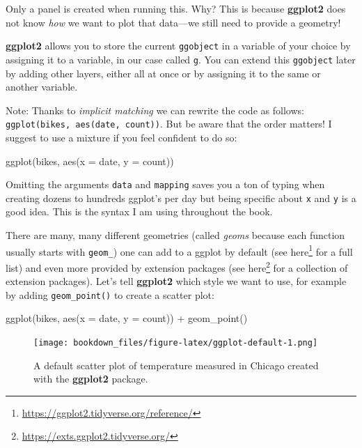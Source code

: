 \documentclass[
]{krantz}
\makeatletter
\newenvironment{Shaded}{\begin{snugshade}}{\end{snugshade}}
\newcommand{\AttributeTok}[1]{\textcolor[rgb]{0.61,0.61,0.61}{#1}}
\newcommand{\FunctionTok}[1]{\textcolor[rgb]{0,0,0}{#1}}
\newcommand{\NormalTok}[1]{#1}
\newcommand{\SpecialCharTok}[1]{\textcolor[rgb]{0,0,0}{#1}}
\renewcommand{\href}[2]{#2\footnote{\url{#1}}}
\newenvironment{kframe}{%
\medskip{}
\setlength{\fboxsep}{.8em}
 \def\at@end@of@kframe{}%
 \ifinner\ifhmode%
  \def\at@end@of@kframe{\end{minipage}}%
  \begin{minipage}{\columnwidth}%
 \fi\fi%
 \def\FrameCommand##1{\hskip\@totalleftmargin \hskip-\fboxsep
 \colorbox{shadecolor}{##1}\hskip-\fboxsep
     \hskip-\linewidth \hskip-\@totalleftmargin \hskip\columnwidth}%
 \MakeFramed {\advance\hsize-\width
   \@totalleftmargin\z@ \linewidth\hsize
   \@setminipage}}%
 {\par\unskip\endMakeFramed%
 \at@end@of@kframe}
\renewenvironment{Shaded}{\begin{kframe}}{\end{kframe}}
\makeatother
\begin{document}
Only a panel is created when running this. Why? This is because \textbf{ggplot2} does not know \emph{how} we want to plot that data---we still need to provide a geometry!

\textbf{ggplot2} allows you to store the current \texttt{ggobject} in a variable of your choice by assigning it to a variable, in our case called \texttt{g}. You can extend this \texttt{ggobject} later by adding other layers, either all at once or by assigning it to the same or another variable.

Note: Thanks to \emph{implicit matching} we can rewrite the code as follows: \texttt{ggplot(bikes,\ aes(date,\ count))}. But be aware that the order matters! I suggest to use a mixture if you feel confident to do so:

\begin{Shaded}
\begin{Highlighting}[]
\FunctionTok{ggplot}\NormalTok{(bikes, }\FunctionTok{aes}\NormalTok{(}\AttributeTok{x =}\NormalTok{ date, }\AttributeTok{y =}\NormalTok{ count))}
\end{Highlighting}
\end{Shaded}

Omitting the arguments \texttt{data} and \texttt{mapping} saves you a ton of typing when creating dozens to hundreds ggplot's per day but being specific about \texttt{x} and \texttt{y} is a good idea. This is the syntax I am using throughout the book.

There are many, many different geometries (called \emph{geoms} because each function usually starts with \texttt{geom\_}) one can add to a ggplot by default (see \href{https://ggplot2.tidyverse.org/reference/}{here} for a full list) and even more provided by extension packages (see \href{https://exts.ggplot2.tidyverse.org/}{here} for a collection of extension packages). Let's tell \textbf{ggplot2} which style we want to use, for example by adding \texttt{geom\_point()} to create a scatter plot:

\begin{Shaded}
\begin{Highlighting}[]
\FunctionTok{ggplot}\NormalTok{(bikes, }\FunctionTok{aes}\NormalTok{(}\AttributeTok{x =}\NormalTok{ date, }\AttributeTok{y =}\NormalTok{ count)) }\SpecialCharTok{+} 
  \FunctionTok{geom\_point}\NormalTok{()}
\end{Highlighting}
\end{Shaded}

\begin{figure}
\centering
\texttt{[image: bookdown\_files/figure-latex/ggplot-default-1.png]}
\caption{\label{fig:ggplot-default}A default scatter plot of temperature measured in Chicago created with the \textbf{ggplot2} package.}
\end{figure}
\end{document}
